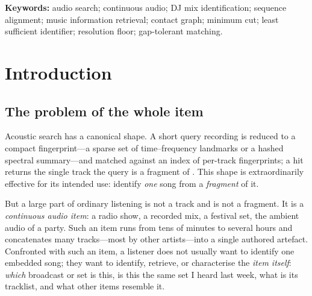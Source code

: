 \documentclass[11pt,twocolumn,a4paper]{article}
\theoremstyle{thmstyle}
\theoremstyle{definition}
\theoremstyle{remark}
\newcommand{\bigOh}{\mathcal{O}}
\begin{document}
\begin{abstract}
gap-tolerant alignment that returns an accounted match together with an explicit
unresolved residual---prove its correctness and $\bigOh(\cdot)$ complexity,
validate every structural result numerically on exact minimum cuts and exact
sequence alignment, and specify an evaluation protocol. The validation makes the
one contingent claim explicit: the whole-item search is cheaper than per-track
fingerprinting only by the \emph{nameable fraction} of the stream (a measured
mean of $3.1\times$, not the worst-case guarantee), because the opening
constituent, having no resolved neighbour, always faces the full pool. The result
is a music search that operates at
the granularity of the listening experience: you search for the \emph{set}, not
for every song in it.
\end{abstract}

\noindent\textbf{Keywords:} audio search; continuous audio; DJ mix
identification; sequence alignment; music information retrieval; contact graph;
minimum cut; least sufficient identifier; resolution floor; gap-tolerant
matching.

\tableofcontents

\section{Introduction}
\label{sec:intro}

\subsection{The problem of the whole item}

Acoustic search has a canonical shape. A short query recording is reduced to a
compact fingerprint---a sparse set of time--frequency landmarks or a hashed
spectral summary---and matched against an index of per-track fingerprints; a
hit returns the single track the query is a fragment of
\citep{wang2003shazam,haitsma2002fingerprint,cano2005review}. This shape is
extraordinarily effective for its intended use: identify \emph{one} song from a
\emph{fragment} of it.

But a large part of ordinary listening is not a track and is not a fragment. It
is a \emph{continuous audio item}: a radio show, a recorded mix, a festival set,
the ambient audio of a party. Such an item runs from tens of minutes to several
hours and concatenates many tracks---most by other artists---into a single
authored artefact. Confronted with such an item, a listener does not usually
want to identify one embedded song; they want to identify, retrieve, or
characterise the \emph{item itself}: \emph{which} broadcast or set is this, is
this the same set I heard last week, what is its tracklist, and what other
items resemble it.
\end{document}
